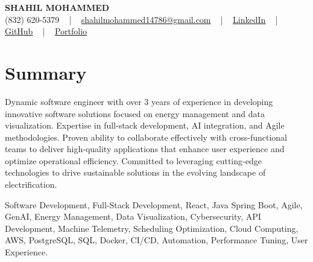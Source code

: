 \documentclass[letterpaper,10pt]{article}
\begin{document}
\begin{center}
    {\fontsize{14pt}{12pt}\selectfont \textbf{\MakeUppercase{Shahil Mohammed}}}\\ \vspace{2pt}
    \fontsize{10pt}{12pt}\selectfont (832) 620-5379 ~ | ~ \href{mailto:shahilmohammed14786@gmail.com}{shahilmohammed14786@gmail.com} ~ | ~  
    \href{https://www.linkedin.com/in/shahil-mohammed-9652931a1/}{\color{blue}\underline{LinkedIn}}  ~ | ~ 
    \href{https://github.com/freakbeast14}{\color{blue}\underline{GitHub}} ~ | ~ 
    \href{https://shahil-mohammed.netlify.app/}{\color{blue}\underline{Portfolio}}
    \vspace{-8pt}
\end{center}

\section{Summary}
\vspace{-2pt}\fontsize{8pt}{9pt}\selectfont
Dynamic software engineer with over 3 years of experience in developing innovative software solutions focused on energy management and data visualization. Expertise in full-stack development, AI integration, and Agile methodologies. Proven ability to collaborate effectively with cross-functional teams to deliver high-quality applications that enhance user experience and optimize operational efficiency. Committed to leveraging cutting-edge technologies to drive sustainable solutions in the evolving landscape of electrification.

{\fontsize{1pt}{1pt}\selectfont\color{white}
Software Development, Full-Stack Development, React, Java Spring Boot, Agile, GenAI, Energy Management, Data Visualization, Cybersecurity, API Development, Machine Telemetry, Scheduling Optimization, Cloud Computing, AWS, PostgreSQL, SQL, Docker, CI/CD, Automation, Performance Tuning, User Experience.
}
\vspace{-8pt}

\vspace{-2pt}
\end{document}
